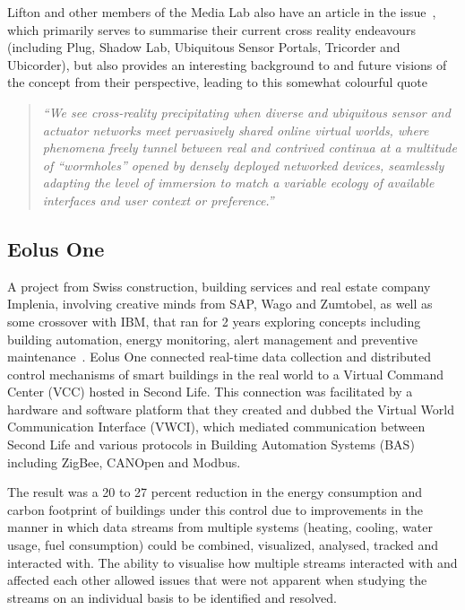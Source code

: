 Lifton and other members of the Media Lab also have an article in the issue~\cite{Lifton2009}, which primarily serves to summarise their current cross reality endeavours (including Plug, Shadow Lab, Ubiquitous Sensor Portals, Tricorder and Ubicorder), but also provides an interesting background to and future visions of the concept from their perspective, leading to this somewhat colourful quote

\begin{quote}
\textit{``We see cross-reality precipitating when diverse and ubiquitous sensor and actuator networks meet pervasively shared online virtual worlds, where phenomena freely tunnel between real and contrived continua at a multitude of ``wormholes'' opened by densely deployed networked devices, seamlessly adapting the level of immersion to match a variable ecology of available interfaces and user context or preference.''}
\end{quote}

\subsection{Eolus One}
\label{subsec:eolus_one}
A project from Swiss construction, building services and real estate company Implenia, involving creative minds from SAP, Wago and Zumtobel, as well as some crossover with IBM, that ran for 2 years exploring concepts including building automation, energy monitoring, alert management and preventive maintenance~\cite{Coleman2009, UgoTrade2007}. Eolus One connected real-time data collection and distributed control mechanisms of smart buildings in the real world to a Virtual Command Center (VCC) hosted in Second Life. This connection was facilitated by a hardware and software platform that they created and dubbed the Virtual World Communication Interface (VWCI), which mediated communication between Second Life and various protocols in Building Automation Systems (BAS) including ZigBee, CANOpen and Modbus.

The result was a 20 to 27 percent reduction in the energy consumption and carbon footprint of buildings under this control due to improvements in the manner in which data streams from multiple systems (heating, cooling, water usage, fuel consumption) could be combined, visualized, analysed, tracked and interacted with. The ability to visualise how multiple streams interacted with and affected each other allowed issues that were not apparent when studying the streams on an individual basis to be identified and resolved.

